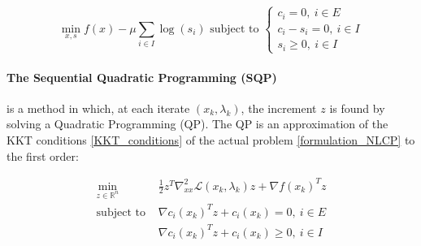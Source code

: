 \begin{equation}
  \min_{x,s}{ f(x)- \mu\sum_{i\in I} \log(s_i)}
  \text{ subject to }
  \left\{
    \begin{array}{l}
     c_i = 0,\ i\in E\\
     c_i - s_i = 0,\ i\in I\\
     s_i \geq 0,\ i\in I
  \end{array}
  \right.
\end{equation}

\paragraph{The Sequential Quadratic Programming (SQP)} is a method in which, at each iterate $(x_k, \lambda_k)$, the increment $z$ is found by solving a Quadratic Programming (QP).
The QP is an approximation of the KKT conditions \ref{KKT_conditions} of the actual problem \ref{formulation_NLCP} to the first order:

\begin{equation}
  \label{approx_QP}
  \begin{array}{ll}
    \min\limits_{z\in \mathbb{R}^n}{} & \frac{1}{2}z^T\nabla_{xx}^2\mathcal{L}(x_k, \lambda_k)z + \nabla f(x_k)^Tz \\
    \text{subject to } & \nabla c_i(x_k)^Tz+c_i(x_k)=0,\ i\in E \\
                       & \nabla c_i(x_k)^Tz+c_i(x_k)\geq 0,\ i\in I
  \end{array}
\end{equation}

